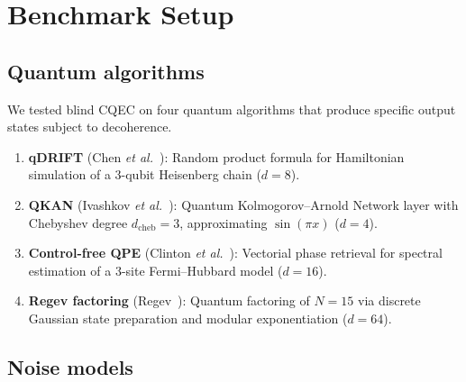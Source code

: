 \documentclass[a4paper,onecolumn]{quantumarticle}
\begin{document}
\section{Benchmark Setup}
\label{sec:setup}

\subsection{Quantum algorithms}
\label{sec:algorithms}

We tested blind CQEC on four quantum algorithms that produce specific output states subject to decoherence.

\begin{enumerate}
\item \textbf{qDRIFT} (Chen \emph{et al.}~\cite{Chen2021}): Random product formula for Hamiltonian simulation of a 3-qubit Heisenberg chain ($d = 8$).
\item \textbf{QKAN} (Ivashkov \emph{et al.}~\cite{Ivashkov2024}): Quantum Kolmogorov--Arnold Network layer with Chebyshev degree $d_\mathrm{cheb} = 3$, approximating $\sin(\pi x)$ ($d = 4$).
\item \textbf{Control-free QPE} (Clinton \emph{et al.}~\cite{Clinton2026}): Vectorial phase retrieval for spectral estimation of a 3-site Fermi--Hubbard model ($d = 16$).
\item \textbf{Regev factoring} (Regev~\cite{Regev2024}): Quantum factoring of $N = 15$ via discrete Gaussian state preparation and modular exponentiation ($d = 64$).
\end{enumerate}

\subsection{Noise models}
\label{sec:noise}
\end{document}
